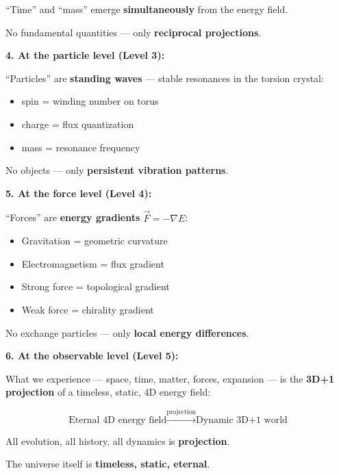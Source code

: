 \begin{revolutionary}
		\vspace{0.3cm}
		
		\enquote{Time} and \enquote{mass} emerge \textbf{simultaneously} from the energy field.
		
		No fundamental quantities — only \textbf{reciprocal projections}.
		
		\vspace{0.5cm}
		
		\textbf{4. At the particle level (Level 3):}
		
		\enquote{Particles} are \textbf{standing waves} — stable resonances in the torsion crystal:
		\begin{itemize}
			\item spin = winding number on torus
			\item charge = flux quantization
			\item mass = resonance frequency
		\end{itemize}
		
		\vspace{0.3cm}
		
		No objects — only \textbf{persistent vibration patterns}.
		
		\vspace{0.5cm}
		
		\textbf{5. At the force level (Level 4):}
		
		\enquote{Forces} are \textbf{energy gradients} $\vec{F} = -\nabla E$:
		\begin{itemize}
			\item Gravitation = geometric curvature
			\item Electromagnetism = flux gradient
			\item Strong force = topological gradient
			\item Weak force = chirality gradient
		\end{itemize}
		
		\vspace{0.3cm}
		
		No exchange particles — only \textbf{local energy differences}.
		
		\vspace{0.5cm}
		
		\textbf{6. At the observable level (Level 5):}
		
		What we experience — space, time, matter, forces, expansion — is the \textbf{3D+1 projection} of a timeless, static, 4D energy field:
		
		\begin{equation}
			\text{Eternal 4D energy field} \xrightarrow{\text{projection}} \text{Dynamic 3D+1 world}
		\end{equation}
		
		\vspace{0.3cm}
		
		All evolution, all history, all dynamics is \textbf{projection}.
		
		The universe itself is \textbf{timeless, static, eternal}.
	\end{revolutionary}
	
